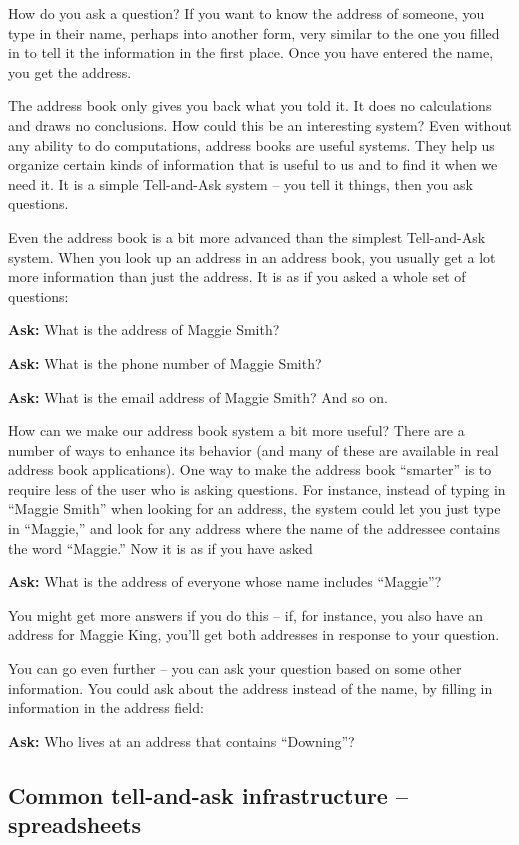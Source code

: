 How do you ask a question? If you want to know the address of someone,
you type in their name, perhaps into another form, very similar to the
one you filled in to tell it the information in the first place. Once
you have entered the name, you get the address.

The address book only gives you back what you told it. It does no
calculations and draws no conclusions. How could this be an interesting
system? Even without any ability to do computations, address books are
useful systems. They help us organize certain kinds of information that
is useful to us and to find it when we need it. It is a simple
Tell-and-Ask system -- you tell it things, then you ask questions.

Even the address book is a bit more advanced than the simplest
Tell-and-Ask system. When you look up an address in an address book, you
usually get a lot more information than just the address. It is as if
you asked a whole set of questions:

\textbf{Ask:} What is the address of Maggie Smith?

\textbf{Ask:} What is the phone number of Maggie Smith? 

\textbf{Ask:} What is the email address of Maggie Smith? And so on.

How can we make our address book system a bit more useful? There are a
number of ways to enhance its behavior (and many of these are available
in real address book applications). One way to make the address book
``smarter'' is to require less of the user who is asking questions. For
instance, instead of typing in ``Maggie Smith'' when looking for an
address, the system could let you just type in ``Maggie,'' and look for
any address where the name of the addressee contains the word
``Maggie.'' Now it is as if you have asked

\textbf{Ask:} What is the address of everyone whose name includes ``Maggie''?

You might get more answers if you do this -- if, for instance, you also
have an address for Maggie
King, you'll get both addresses in response to your question.

You can go even further -- you can ask your question based on some other
information. You could ask about the address instead of the name, by
filling in information in the address field:

\textbf{Ask:} Who lives at an address that contains ``Downing''?

\subsection{Common tell-and-ask infrastructure -- spreadsheets}

